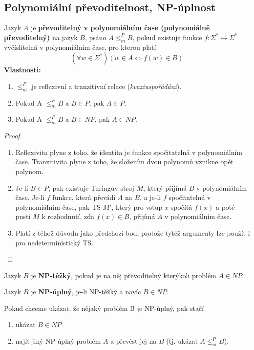 \documentclass[11pt]{report} %
\begin{document}
\subsection{Polynomiální převoditelnost, NP-úplnost}
Jazyk $A$ je \textbf{převoditelný v polynomiálním čase (polynomiálně převoditelný)} na jazyk $B$, psáno $A \leq_m^P B$, pokud existuje funkce $f : \Sigma^* \mapsto \Sigma^*$ vyčíslitelná v polynomiálním čase, pro kterou platí
$$(\forall w \in \Sigma^*) (w \in A \Leftrightarrow f(w) \in B)$$
\textbf{Vlastnosti:}
\begin{enumerate}
	\leftskip 20pt
	\setlength{\itemsep}{0pt}
	\item $\leq_m^P$ je reflexivní a tranzitivní relace (\textit{kvaziuspořádání}).
	\item Pokud A $\leq_m^P B$ a $B \in P$, pak $A \in P$.
	\item Pokud A $\leq_m^P B$ a $B \in NP$, pak $A \in NP$.
\end{enumerate}
\begin{proof}~
	\begin{enumerate}
		\leftskip 20pt
		\setlength{\itemsep}{0pt}
		\item Reflexivita plyne z toho, že identita je funkce spočitatelná v polynomiálním čase. Tranzitivita plyne z toho, že složením dvou polynomů vznikne opět polynom.
		\item Je-li $B \in P$, pak existuje Turingův stroj $M$, který přijímá $B$ v polynomiálním čase. Je-li $f$ funkce, která převádí $A$ na $B$, a je-li $f$ spočitatelná v polynomiálním čase, pak TS $M'$, který pro vstup $x$ spočítá $f(x)$ a poté pustí $M$ k rozhodnutí, zda $f(x) \in B$, přijímá $A$ v polynomiálním čase.
		\item Platí z téhož důvodu jako předchozí bod, protože tytéž argumenty lze použít i pro nedeterministický TS.
	\end{enumerate}
\end{proof}

Jazyk $B$ je \textbf{NP-těžký}, pokud je na něj převoditelný kterýkoli problém $A \in NP$.

Jazyk $B$ je \textbf{NP-úplný}, je-li NP-těžký a navíc $B \in NP$.

Pokud chceme ukázat, že nějaký problém B je NP-úplný, pak stačí
\begin{enumerate}
\leftskip 20pt
\setlength{\itemsep}{0pt}
	\item ukázat $B \in NP$
	\item najít jiný NP-úplný problém $A$ a převést jej na $B$ (tj. ukázat $A \leq_m^P B$).
\end{enumerate}
\end{document}
